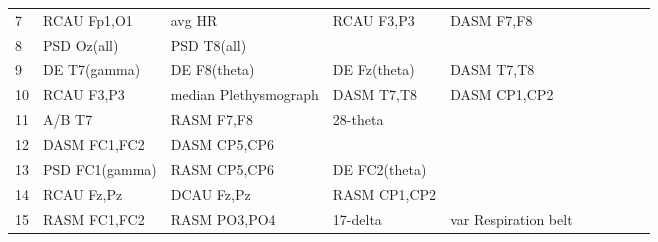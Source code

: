 \begin{landscape}
\begin{table}[]
\begin{tabular}{l|llllllll}
7        & RCAU Fp1,O1           & avg HR                & RCAU F3,P3           & DASM F7,F8              &                         &                      &                      &                       &                       &                    \\
8        & PSD Oz(all)           & PSD T8(all)           &                      &                         &                         &                      &                      &                       &                       &                    \\
9        & DE T7(gamma)          & DE F8(theta)          & DE Fz(theta)         & DASM T7,T8              &                         &                      &                      &                       &                       &                    \\
10       & RCAU F3,P3            & median Plethysmograph & DASM T7,T8           & DASM CP1,CP2            &                         &                      &                      &                       &                       &                    \\
11       & A/B T7                & RASM F7,F8            & 28-theta             &                         &                         &                      &                      &                       &                       &                    \\
12       & DASM FC1,FC2          & DASM CP5,CP6          &                      &                         &                         &                      &                      &                       &                       &                    \\
13       & PSD FC1(gamma)        & RASM CP5,CP6          & DE FC2(theta)        &                         &                         &                      &                      &                       &                       &                    \\
14       & RCAU Fz,Pz            & DCAU Fz,Pz            & RASM CP1,CP2         &                         &                         &                      &                      &                       &                       &                    \\
15       & RASM FC1,FC2          & RASM PO3,PO4          & 17-delta             & var Respiration belt    &                         &                      &                      &                       &                       &                    \\

\end{tabular}
\end{table}
\end{landscape}
